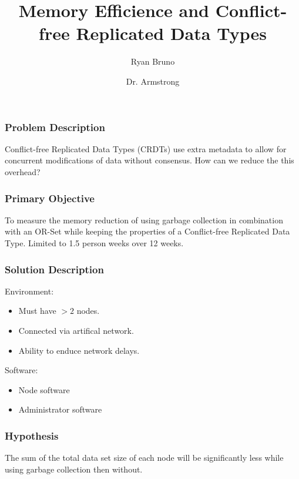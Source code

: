\documentclass{beamer}
\title{Memory Efficience and Conflict-free Replicated Data Types}
\author{Ryan Bruno \and Dr. Armstrong}
\date{}
\begin{document}
\frame{\titlepage}

\begin{frame}
\frametitle{Problem Description}
Conflict-free Replicated Data Types (CRDTs) use extra metadata to allow for concurrent modifications of data without consensus. How can we reduce the this overhead?
\end{frame}

\begin{frame}
\frametitle{Primary Objective}
To measure the memory reduction of using garbage collection in combination with an OR-Set while keeping the properties of a Conflict-free Replicated Data Type. Limited to 1.5 person weeks over 12 weeks.
\end{frame}

\begin{frame}
\frametitle{Solution Description}

Environment:

\begin{itemize}
\item Must have $> 2$ nodes.
\item Connected via artifical network.
\item Ability to enduce network delays.
\end{itemize}

Software:

\begin{itemize}
\item Node software
\item Administrator software
\end{itemize}
\end{frame}

\begin{frame}
\frametitle{Hypothesis}
The sum of the total data set size of each node will be significantly less while using garbage collection then without.
\end{frame}
\end{document}
